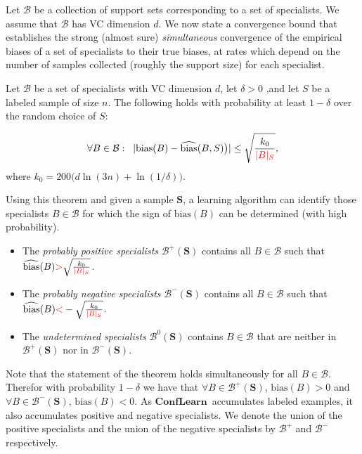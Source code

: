 \documentclass{colt2019} %
\newcommand{\new}[1]{\textcolor{red}{#1}}
\newcommand{\cB}{\mathcal{B}}
\newcommand{\ActiveLearn}{$\mathbf{ConfLearn}$}
\newcommand{\samp}{S}
\newcommand{\bias}{\text{bias}}
\newcommand{\ebias}{\widehat{\text{bias}}}
\begin{document}
Let $\cB$ be a collection of support sets corresponding to a set of
specialists. We assume that $\cB$ has VC dimension $d$. We now state a
convergence bound that establishes the strong (almost sure)
\emph{simultaneous} convergence of the empirical biases of a set of
specialists to their true biases, at rates which depend on the number
of samples collected (roughly the support size) for each specialist.

\begin{theorem}\label{thm:UCECM}
Let $\cB$ be a set of specialists with VC dimension $d$, let
$\delta>0$ ,and let $\samp$ be a labeled sample of size $n$.  The
following holds with probability at least $1-\delta$ over the random
choice of $\samp$:

\[\forall B\in\cB :\;\;
\lvert \bias(B) - \ebias(B,\samp) \bigr) \rvert
\leq \sqrt{\frac{k_0}{\new{\lvert B\rvert_S}}},
\]
where $k_0 =200\bigl(d\ln(3n) + \ln(1/\delta)\bigr)$.
\end{theorem}


\newcommand{\sample}[1]{{\mathbf #1}}
\newcommand{\constr}[3]{#1 \left(#2,\sample{#3}\right)}
  
Using this theorem and given a sample $\sample{S}$, 
a learning algorithm can identify those specialists $B \in \cB$ for which the sign of
$\bias(B)$ can be determined (with high probability). 
\begin{itemize}
\item The \emph{probably positive specialists} $\cB^{+} (\sample{S})$ contains all $B \in \cB$ such that
  $\ebias(B) \new{>} \sqrt{\frac{k_0}{\new{\lvert B\rvert_S}}}$.
\item The \emph{probably negative specialists} $\cB^{-} (\sample{S})$ contains all $B \in \cB$ such that
  $\ebias(B) \new{<} -\sqrt{\frac{k_0}{\new{\lvert B\rvert_S}}}$.
\item The \emph{undetermined specialists} $\cB^{0} (\sample{S})$ contains $B \in \cB$ that are neither in
  $\cB^{+} (\sample{S})$ nor in $\cB^{-} (\sample{S})$.
\end{itemize}

Note that the statement of the theorem holds simultaneously for all $B \in
\cB$. Therefor with probability $1-\delta$ we have that $\forall B \in
\cB^{+} (\sample{S})$, $\bias(B)>0$ and $\forall B \in \cB^{-}
(\sample{S})$, $\bias(B)<0$. As \ActiveLearn\ accumulates labeled
examples, it also accumulates positive and negative specialists. We
denote the union of the positive specialists and the union of the negative
specialists by $\cB^+$ and $\cB^-$ respectively.
\end{document}
